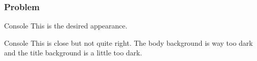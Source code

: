 \documentclass[aspectratio=169]{beamer}
\begin{document}
\begin{frame}
\frametitle{Problem}

  \begin{block}{Console}
    This is the desired appearance.
  \end{block} 

  \begin{consoleBox}{Console}
    This is close but not quite right.  The body background is way too
    dark and the title background is a little too dark.
  \end{consoleBox}

\end{frame}
\end{document}
